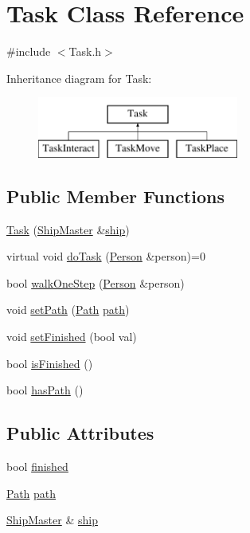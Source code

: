 \hypertarget{classTask}{\section{Task Class Reference}
\label{classTask}
}


{\ttfamily \#include $<$Task.\-h$>$}

Inheritance diagram for Task\-:\begin{figure}[H]
\begin{center}
\leavevmode
\includegraphics[height=2.000000cm]{classTask}
\end{center}
\end{figure}
\subsection*{Public Member Functions}
\begin{DoxyCompactItemize}
\item 
\hyperlink{classTask_abf784be50708a30e505f06e95205b326}{Task} (\hyperlink{classShipMaster}{Ship\-Master} \&\hyperlink{classTask_af765f4e3eab35d064f5cf18506b7c9a2}{ship})
\item 
virtual void \hyperlink{classTask_a186a7a8e9fa7d9bbd8c9fd3bf742250f}{do\-Task} (\hyperlink{classPerson}{Person} \&person)=0
\item 
bool \hyperlink{classTask_ae74007e9c8f09fea6504fd7c18550b9a}{walk\-One\-Step} (\hyperlink{classPerson}{Person} \&person)
\item 
void \hyperlink{classTask_a4090ed9b1ff941f0e284df65007a0dbc}{set\-Path} (\hyperlink{classPath}{Path} \hyperlink{classTask_a31352b3b35827e5898ceb39332fb1d77}{path})
\item 
void \hyperlink{classTask_a488b0f976e503b6af2dcc8cbfedbe6d8}{set\-Finished} (bool val)
\item 
bool \hyperlink{classTask_aa8013289fde3086e1c8816f65ed9298e}{is\-Finished} ()
\item 
bool \hyperlink{classTask_a096a6563f747c3b5f62bc4cf55efa37d}{has\-Path} ()
\end{DoxyCompactItemize}
\subsection*{Public Attributes}
\begin{DoxyCompactItemize}
\item 
bool \hyperlink{classTask_a81aa161cc48dc53e86b3d8dfa9d5dfe7}{finished}
\item 
\hyperlink{classPath}{Path} \hyperlink{classTask_a31352b3b35827e5898ceb39332fb1d77}{path}
\item 
\hyperlink{classShipMaster}{Ship\-Master} \& \hyperlink{classTask_af765f4e3eab35d064f5cf18506b7c9a2}{ship}
\end{DoxyCompactItemize}


